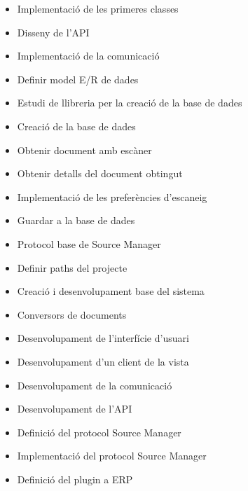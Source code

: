 \documentclass[letterpaper,11pt,catalan]{sphinxmanual}
\begin{document}
\begin{itemize}
\item {} 
Implementació de les primeres classes

\item {} 
Disseny de l'API

\item {} 
Implementació de la comunicació

\item {} 
Definir model E/R de dades

\item {} 
Estudi de llibreria per la creació de la base de dades

\item {} 
Creació de la base de dades

\item {} 
Obtenir document amb escàner

\item {} 
Obtenir detalls del document obtingut

\item {} 
Implementació de les preferències d'escaneig

\item {} 
Guardar a la base de dades

\item {} 
Protocol base de Source Manager

\item {} 
Definir paths del projecte

\item {} 
Creació i desenvolupament base del sistema

\item {} 
Conversors de documents

\item {} 
Desenvolupament de l'interfície d'usuari

\item {} 
Desenvolupament d'un client de la vista

\item {} 
Desenvolupament de la comunicació

\item {} 
Desenvolupament de l'API

\item {} 
Definició del protocol Source Manager

\item {} 
Implementació del protocol Source Manager

\item {} 
Definició del plugin a ERP


\end{itemize}
\end{document}
